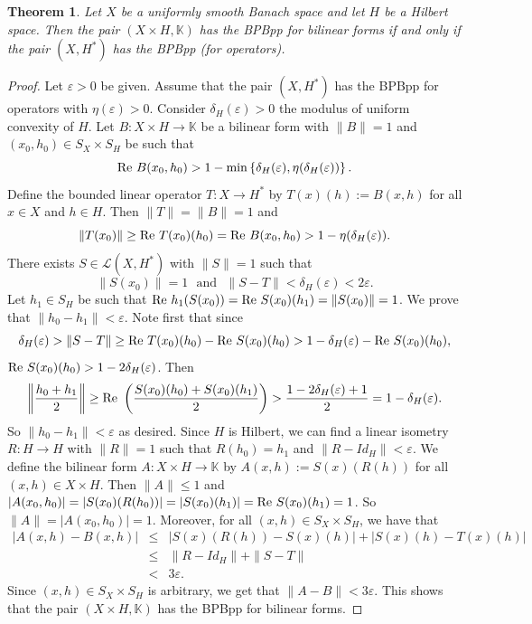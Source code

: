 \documentclass[12pt,a4paper]{amsart}
\newtheorem{theorem}{Theorem}[section]
\theoremstyle{definition}
\newcommand{\e}{\varepsilon}
\DeclareMathOperator{\re}{Re}
\numberwithin{equation}{section}
\newcommand{\K}{\mathbb{K}} %
\def\K{{\mathbb K}}
\def\re{\hbox{\rm Re~}}
\begin{document}
\begin{theorem} Let $X$ be a uniformly smooth Banach space and let $H$ be a Hilbert space. Then the pair $(X \times H, \K)$ has the BPBpp for bilinear forms if and only if the pair $(X, H^*)$ has the BPBpp (for operators).
\label{DKL10}
\end{theorem}

\begin{proof} Let $\e > 0$ be given. Assume that the pair $(X, H^*)$ has the BPBpp for operators with $\eta(\e) > 0$. Consider $\delta_H(\e) > 0$ the modulus of uniform convexity of $H$. Let $B: X \times H \longrightarrow \K$ be a bilinear form with $\|B\| = 1$ and $(x_0, h_0) \in S_X \times S_H$ be such that
\begin{equation*}
\re B(x_0, h_0) > 1 - \min \left\{ \delta_H(\e), \eta(\delta_H(\e)) \right\}.
\end{equation*}
Define the bounded linear operator $T: X \rightarrow H^*$ by $T(x)(h) := B(x, h)$ for all $x \in X$ and $h \in H$. Then $\|T\| = \|B\| = 1$ and
\begin{equation*}
\|T(x_0)\| \geq \re T(x_0)(h_0) = \re B(x_0, h_0) > 1 - \eta(\delta_H(\e)).
\end{equation*}
There exists $S \in \mathcal{L}(X, H^*)$ with $\|S\| = 1$ such that
\begin{equation*}
\|S(x_0)\| = 1 \ \ \ \mbox{and} \ \ \ \|S - T\| < \delta_H(\e) < 2 \e.
\end{equation*}
Let $h_1 \in S_H$ be such that $\re h_1(S(x_0)) = \re S(x_0)(h_1) = \|S(x_0)\| = 1$. We prove that $\|h_0 - h_1\| < \e$. Note first that since
\begin{equation*}
\delta_H(\e) > \|S - T\| \geq \re T(x_0)(h_0) - \re S(x_0)(h_0) > 1 - \delta_H(\e) - \re S(x_0)(h_0),
\end{equation*}
$\re S(x_0)(h_0) > 1 - 2 \delta_H(\e)$. Then
\begin{equation*}
\left\| \frac{h_0 + h_1}{2} \right\| \geq \re \left( \frac{ S(x_0)(h_0) + S(x_0)(h_1)}{2} \right) > \frac{1 - 2 \delta_H(\e) + 1}{2} = 1 - \delta_H(\e).
\end{equation*}
So $\|h_0 - h_1\| < \e$ as desired. Since $H$ is Hilbert, we can find a linear isometry $R: H \longrightarrow H$ with $\|R\| = 1$ such that $R(h_0) = h_1$ and $\|R - Id_H\| < \e$. We define the bilinear form $A: X \times H \longrightarrow \K$ by $A(x, h) := S(x)(R(h))$ for all $(x, h) \in X \times H$. Then $\|A\| \leq 1$ and $|A(x_0, h_0)| = |S(x_0)(R(h_0))| = |S(x_0)(h_1)| = \re S(x_0)(h_1) = 1$. So $\|A\| = |A(x_0, h_0)| = 1$. Moreover, for all $(x, h) \in S_X \times S_H$, we have that
\begin{eqnarray*}
|A(x, h) - B(x, h)| &\leq& |S(x)(R(h)) - S(x)(h)| + |S(x)(h) - T(x)(h)|  \\
&\leq& \|R - Id_H\| + \|S - T\| \\
&<& 3 \e.
\end{eqnarray*}
Since $(x, h) \in S_X \times S_H$ is arbitrary, we get that $\|A - B\| < 3 \e$. This shows that the pair $(X \times H, \K)$ has the BPBpp for bilinear forms.
\end{proof}
\end{document}
